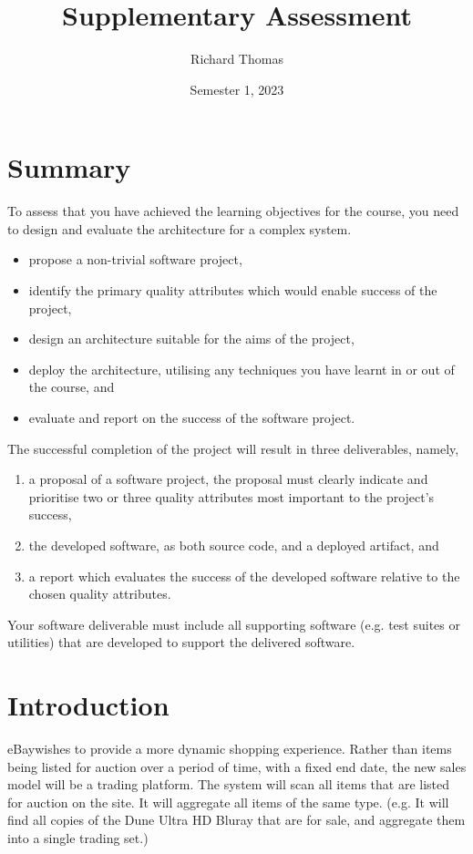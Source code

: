 \documentclass{csse4400}
\title{Supplementary Assessment}
\author{Richard Thomas}
\date{Semester 1, 2023}
\begin{document}
\maketitle

\section*{Summary}
To assess that you have achieved the learning objectives for the course,
you need to design and evaluate the architecture for a complex system.
\begin{itemize}
    \item propose a non-trivial software project,
    \item identify the primary quality attributes which would enable success of the project,
    \item design an architecture suitable for the aims of the project,
    \item deploy the architecture, utilising any techniques you have learnt in or out of the course, and
    \item evaluate and report on the success of the software project.
\end{itemize}

\noindent
The successful completion of the project will result in three deliverables, namely,
\begin{enumerate}[label=\roman*]
    \item a proposal of a software project, the proposal must clearly indicate and prioritise two or three quality attributes most important to the project's success,
    \item the developed software, as both source code, and a deployed artifact, and
    \item a report which evaluates the success of the developed software relative to the chosen quality attributes.
\end{enumerate}

\noindent
Your software deliverable must include all supporting software (e.g. test suites or utilities) that are developed to support the delivered software.

\section{Introduction}
eBay\texttrademark wishes to provide a more dynamic shopping experience.
Rather than items being listed for auction over a period of time, with a fixed end date,
the new sales model will be a trading platform.
The system will scan all items that are listed for auction on the site.
It will aggregate all items of the same type.
(e.g. It will find all copies of the Dune Ultra HD Bluray that are for sale, and aggregate them into a single trading set.)
\end{document}
